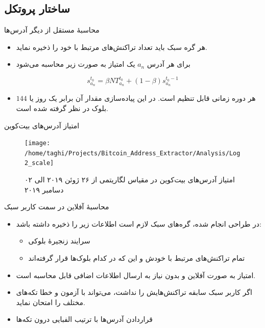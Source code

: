 \documentclass{beamer}
\begin{document}
\subsection{ساختار پروتکل}
\begin{frame}{محاسبهٔ مستقل از دیگر آدرس‌ها}
	\begin{itemize}
		\item {%
		هر گره سبک باید تعداد تراکنش‌های مرتبط با خود را ذخیره نماید.}
		\item {%
			برای هر آدرس $a_n$ یک امتیاز به صورت زیر محاسبه می‌شود
		} 
	\end{itemize}

\begin{equation}
s_{a_n}^{t_0} = \beta NT_{a_n}^{t_0} + (1-\beta) s_{a_n}^{t_0-1}
\label{eq:6}
\end{equation}

\begin{itemize}
	\item {%
	هر دوره زمانی قابل تنظیم است. در این پیاده‌سازی مقدار آن برابر یک روز یا $144$ بلوک در نظر گرفته شده است.}
\end{itemize}

\end{frame}

\begin{frame}{امتیاز آدرس‌های بیت‌کوین}
	\begin{figure}[t]
		\centering
		\texttt{[image: /home/taghi/Projects/Bitcoin\_Address\_Extractor/Analysis/Log2\_scale]}
		\caption[امتیاز آدرس‌های بیت‌کوین در مقیاس لگاریتمی]{امتیاز آدرس‌های بیت‌کوین در مقیاس لگاریتمی از ۲۶ ژوئن ۲۰۱۹ الی ۰۲ دسامبر ۲۰۱۹}
		\label{fig:log2scale}
	\end{figure}
\end{frame}

\begin{frame}{محاسبه‌ٔ آفلاین در سمت کاربر سبک}
	\begin{itemize}
		\item{%
			در طراحی انجام شده، گره‌های سبک لازم است اطلاعات زیر را ذخیره داشته باشد:
	\begin{itemize}
		\item سرایند زنجیرهٔ بلوکی
		\item تمام تراکنش‌های مرتبط با خودش و این که در کدام بلوک‌ها قرار گرفته‌اند
\end{itemize}	}
		\item {%
		امتیاز به صورت آفلاین و بدون نیاز به ارسال اطلاعات اضافی قابل محاسبه است.}
		\item {
			اگر کاربر سبک سابقه تراکنش‌هایش را نداشت، می‌تواند با آزمون و خطا تکه‌های مختلف را امتحان نماید.
			}
		\item{%
		قراردادن آدرس‌ها با ترتیب الفبایی درون تکه‌ها}
	\end{itemize}
\end{frame}
\end{document}
